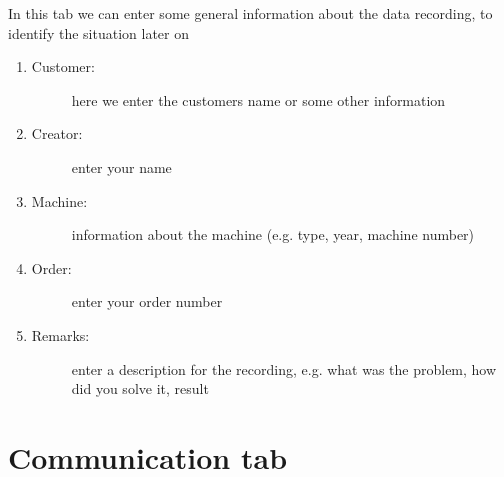 \documentclass[a4paper,10pt,english]{sphinxmanual}
\begin{document}
In this tab we can enter some general information about the data recording, to identify the situation later on
\begin{enumerate}
%
\item {} \begin{description}
\item[{Customer:}] \leavevmode
here we enter the customers name or some other information

\end{description}

\item {} \begin{description}
\item[{Creator:}] \leavevmode
enter your name

\end{description}

\item {} \begin{description}
\item[{Machine:}] \leavevmode
information about the machine (e.g. type, year, machine number)

\end{description}

\item {} \begin{description}
\item[{Order:}] \leavevmode
enter your order number

\end{description}

\item {} \begin{description}
\item[{Remarks:}] \leavevmode
enter a description for the recording, e.g. what was the problem, how did you solve it, result

\end{description}

\end{enumerate}


\chapter{Communication tab}
\label{\detokenize{com:communication-tab}}\label{\detokenize{com::doc}}
\end{document}
